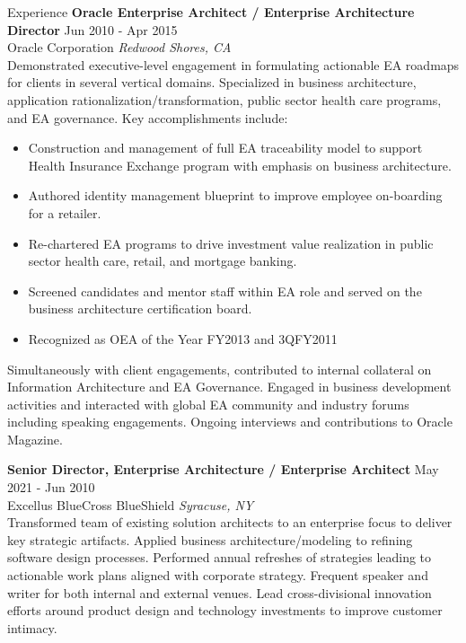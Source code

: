 \documentclass{resume} %
\begin{document}
\begin{rSection}{Experience}
\textbf{Oracle Enterprise Architect / Enterprise Architecture Director} \hfill Jun 2010 - Apr 2015\\
Oracle Corporation \hfill \textit{Redwood Shores, CA}\\
Demonstrated executive-level engagement in formulating actionable EA roadmaps for clients in several vertical domains. Specialized in business architecture, application rationalization/transformation, public sector health care programs, and EA governance. Key accomplishments include:
\begin{itemize}
   \itemsep -3pt {} 
   \item Construction and management of full EA traceability model to support Health Insurance Exchange program with emphasis on business architecture.
   \item Authored identity management blueprint to improve employee on-boarding for a retailer.
   \item Re-chartered EA programs to drive investment value realization in public sector health care, retail, and mortgage banking.
   \item Screened candidates and mentor staff within EA role and served on the business architecture certification board.
   \item Recognized as OEA of the Year FY2013 and 3QFY2011
\end{itemize}
Simultaneously with client engagements, contributed to internal collateral on Information Architecture and EA Governance. Engaged in business development activities and interacted with global EA community and industry forums including speaking engagements. Ongoing interviews and contributions to Oracle Magazine.

\end{rSection} 

\textbf{Senior Director, Enterprise Architecture / Enterprise Architect} \hfill May 2021 - Jun 2010\\
Excellus BlueCross BlueShield \hfill \textit{Syracuse, NY}\\
Transformed team of existing solution architects to an enterprise focus to deliver key strategic artifacts. Applied business architecture/modeling to refining software design processes. Performed annual refreshes of strategies leading to actionable work plans aligned with corporate strategy. Frequent speaker and writer for both internal and external venues. Lead cross-divisional innovation efforts around product design and technology investments to improve customer intimacy.
\end{document}
